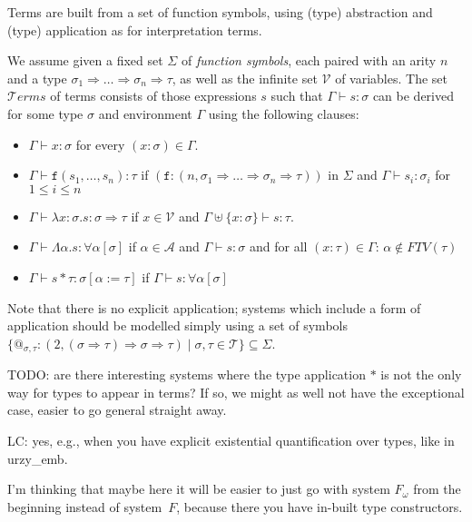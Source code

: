 \documentclass[runningheads,a4paper]{llncs}
\newcommand{\Typevars}{\mathcal{A}}
\newcommand{\Vars}{\mathcal{V}}
\newcommand{\Types}{\mathcal{T}}
\newcommand{\Terms}{\mathcal{T}\!\mathit{erms}}
\newcommand{\quant}[2]{\forall #1[#2]}
\newcommand{\arrtype}{\Rightarrow}
\newcommand{\abs}[2]{\lambda #1.#2}
\newcommand{\tabs}[2]{\Lambda #1.#2}
\newcommand{\tapp}[2]{#1 * #2}
\newcommand{\subst}[2]{#1:=#2}
\newcommand{\FTV}{\mathit{FTV}}
\begin{document}
Terms are built from a set of function symbols, using (type) abstraction
and (type) application as for interpretation terms.

\begin{definition}
We assume given a fixed set $\Sigma$ of \emph{function symbols}, each
paired with an arity $n$ and a type $\sigma_1 \arrtype \dots \arrtype
\sigma_n \arrtype \tau$, as well as the infinite set $\Vars$ of variables.
The set $\Terms$ of terms consists of those expressions $s$ such that
$\Gamma \vdash s : \sigma$ can be derived for some type $\sigma$ and
environment $\Gamma$ using the following clauses:
\begin{itemize}
\item $\Gamma \vdash x : \sigma$ for every $(x : \sigma) \in \Gamma$.
\item $\Gamma \vdash \mathtt{f}(s_1,\dots,s_n) : \tau$ if
  $(\mathtt{f} : (n,\sigma_1 \arrtype \dots \arrtype \sigma_n \arrtype
  \tau))$ in $\Sigma$ and $\Gamma \vdash s_i : \sigma_i$ for $1 \leq
  i \leq n$
\item $\Gamma \vdash \abs{x:\sigma}{s} : \sigma \arrtype \tau$ if $x
  \in \Vars$ and $\Gamma \uplus \{ x : \sigma \} \vdash s : \tau$.
\item $\Gamma \vdash \tabs{\alpha}{s} : \quant{\alpha}{\sigma}$ if
  $\alpha \in \Typevars$ and $\Gamma \vdash s : \sigma$ and for all
  $(x : \tau) \in \Gamma$: $\alpha \notin \FTV(\tau)$
\item $\Gamma \vdash \tapp{s}{\tau} : \sigma[\subst{\alpha}{\tau}]$ if
  $\Gamma \vdash s : \quant{\alpha}{\sigma}$
\end{itemize}
\end{definition}

Note that there is no explicit application; systems which include a form
of application should be modelled simply using a set of symbols $\{
@_{\sigma,\tau}: (2,(\sigma \arrtype \tau) \arrtype \sigma \arrtype \tau)
\mid \sigma,\tau \in \Types \} \subseteq \Sigma$.

TODO: are there interesting systems where the type application $*$ is
not the only way for types to appear in terms?  If so, we might as well
not have the exceptional case, easier to go general straight away.

LC: yes, e.g., when you have explicit existential quantification over
types, like in urzy\_emb.

I'm thinking that maybe here it will be easier to just go with
system $F_\omega$ from the beginning instead of system~$F$, because
there you have in-built type constructors.
\end{document}
